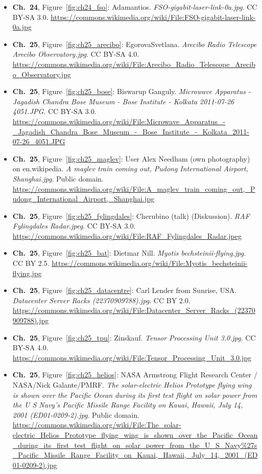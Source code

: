 \begin{small}
\begin{itemize}[leftmargin=0pt,itemsep=2pt,label={}]
\item \textbf{Ch.~24}, Figure~\ref{fig:ch24_fso}: Adamantios. \emph{FSO-\allowbreak{}gigabit-\allowbreak{}laser-\allowbreak{}link-\allowbreak{}0a.\allowbreak{}jpg}. CC BY-SA 3.0. \url{https://commons.wikimedia.org/wiki/File:FSO-gigabit-laser-link-0a.jpg}
\item \textbf{Ch.~25}, Figure~\ref{fig:ch25_arecibo}: EgorovaSvetlana. \emph{Arecibo Radio Telescope Arecibo Observatory.\allowbreak{}jpg}. CC BY-SA 4.0. \url{https://commons.wikimedia.org/wiki/File:Arecibo_Radio_Telescope_Arecibo_Observatory.jpg}
\item \textbf{Ch.~25}, Figure~\ref{fig:ch25_bose}: Biswarup Ganguly. \emph{Microwave Apparatus -\allowbreak{} Jagadish Chandra Bose Museum -\allowbreak{} Bose Institute -\allowbreak{} Kolkata 2011-\allowbreak{}07-\allowbreak{}26 4051.\allowbreak{}JPG}. CC BY-SA 3.0. \url{https://commons.wikimedia.org/wiki/File:Microwave_Apparatus_-_Jagadish_Chandra_Bose_Museum_-_Bose_Institute_-_Kolkata_2011-07-26_4051.JPG}
\item \textbf{Ch.~25}, Figure~\ref{fig:ch25_maglev}: User Alex Needham (own photography) on en.wikipedia. \emph{A maglev train coming out, Pudong International Airport, Shanghai.\allowbreak{}jpg}. Public domain. \url{https://commons.wikimedia.org/wiki/File:A_maglev_train_coming_out,_Pudong_International_Airport,_Shanghai.jpg}
\item \textbf{Ch.~25}, Figure~\ref{fig:ch25_fylingdales}: Cherubino (talk) (Diskussion). \emph{RAF Fylingdales Radar.\allowbreak{}jpeg}. CC BY-SA 3.0. \url{https://commons.wikimedia.org/wiki/File:RAF_Fylingdales_Radar.jpeg}
\item \textbf{Ch.~25}, Figure~\ref{fig:ch25_bat}: Dietmar Nill. \emph{Myotis bechsteinii-\allowbreak{}flying.\allowbreak{}jpg}. CC BY 2.5. \url{https://commons.wikimedia.org/wiki/File:Myotis_bechsteinii-flying.jpg}
\item \textbf{Ch.~25}, Figure~\ref{fig:ch25_datacentre}: Carl Lender from Sunrise, USA. \emph{Datacenter Server Racks (22370909788).\allowbreak{}jpg}. CC BY 2.0. \url{https://commons.wikimedia.org/wiki/File:Datacenter_Server_Racks_(22370909788).jpg}
\item \textbf{Ch.~25}, Figure~\ref{fig:ch25_tpu}: Zinskauf. \emph{Tensor Processing Unit 3.\allowbreak{}0.\allowbreak{}jpg}. CC BY-SA 4.0. \url{https://commons.wikimedia.org/wiki/File:Tensor_Processing_Unit_3.0.jpg}
\item \textbf{Ch.~25}, Figure~\ref{fig:ch25_helios}: NASA Armstrong Flight Research Center / NASA/Nick Galante/PMRF. \emph{The solar-\allowbreak{}electric Helios Prototype flying wing is shown over the Pacific Ocean during its first test flight on solar power from the U S Navy's Pacific Missile Range Facility on Kauai, Hawaii, July 14, 2001 (ED01-\allowbreak{}0209-\allowbreak{}2).\allowbreak{}jpg}. Public domain. \url{https://commons.wikimedia.org/wiki/File:The_solar-electric_Helios_Prototype_flying_wing_is_shown_over_the_Pacific_Ocean_during_its_first_test_flight_on_solar_power_from_the_U_S_Navy%27s_Pacific_Missile_Range_Facility_on_Kauai,_Hawaii,_July_14,_2001_(ED01-0209-2).jpg}

\end{itemize}
\end{small}
